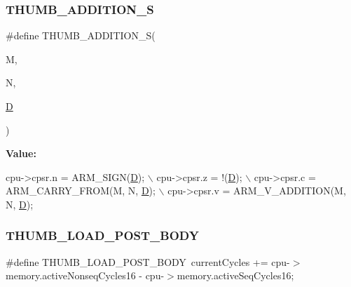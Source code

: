 \subsubsection{\texorpdfstring{T\+H\+U\+M\+B\+\_\+\+A\+D\+D\+I\+T\+I\+O\+N\+\_\+S}{THUMB\_ADDITION\_S}}
{\footnotesize\ttfamily \#define T\+H\+U\+M\+B\+\_\+\+A\+D\+D\+I\+T\+I\+O\+N\+\_\+S(\begin{DoxyParamCaption}\item[{}]{M,  }\item[{}]{N,  }\item[{}]{\mbox{\hyperlink{_aes_8c_adef282f11138cda3d081cc21280a8d12}{D}} }\end{DoxyParamCaption})}

{\bfseries Value\+:}
\begin{DoxyCode}
cpu->cpsr.n = ARM\_SIGN(\mbox{\hyperlink{_aes_8c_adef282f11138cda3d081cc21280a8d12}{D}}); \(\backslash\)
    cpu->cpsr.z = !(\mbox{\hyperlink{_aes_8c_adef282f11138cda3d081cc21280a8d12}{D}}); \(\backslash\)
    cpu->cpsr.c = ARM\_CARRY\_FROM(M, N, \mbox{\hyperlink{_aes_8c_adef282f11138cda3d081cc21280a8d12}{D}}); \(\backslash\)
    cpu->cpsr.v = ARM\_V\_ADDITION(M, N, \mbox{\hyperlink{_aes_8c_adef282f11138cda3d081cc21280a8d12}{D}});
\end{DoxyCode}
\mbox{\label{isa-thumb_8c_af849c1ee0059b114cd464e7f3c31e6f0}} 
\subsubsection{\texorpdfstring{T\+H\+U\+M\+B\+\_\+\+L\+O\+A\+D\+\_\+\+P\+O\+S\+T\+\_\+\+B\+O\+DY}{THUMB\_LOAD\_POST\_BODY}}
{\footnotesize\ttfamily \#define T\+H\+U\+M\+B\+\_\+\+L\+O\+A\+D\+\_\+\+P\+O\+S\+T\+\_\+\+B\+O\+DY~current\+Cycles += cpu-\/$>$memory.\+active\+Nonseq\+Cycles16 -\/ cpu-\/$>$memory.\+active\+Seq\+Cycles16;}

\mbox{\label{isa-thumb_8c_a30bedc7922ec18fb0276d5f67b7abee8}} 
